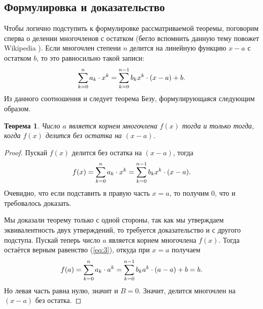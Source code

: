 \documentclass[12pt]{article}
\newtheorem{theorem}{Теорема}[section]
\begin{document}
\subsection{Формулировка и доказательство}
Чтобы логично подступить к формулировке рассматриваемой теоремы, поговорим сперва о делении многочленов с остатком (бегло вспомнить данную тему повожет Wikipedia \cite{poly_div}). Если многочлен степени $n$ делится на линейную функцию $x-a$ с остатком $b$, то это равносильно такой записи:
\begin{equation}
\sum_{k=0}^n{a_k \cdot x^k} = \sum_{k=0}^{n-1}{b_k x^k}\cdot \qty(x-a) + b.
\label{eq:3}
\end{equation}
Из данного соотношения и следует теорема Безу, формулирующаяся следующим образом.
\begin{theorem}
	Число $a$ является корнем многочлена $f(x)$ тогда и только тогда, когда $f(x)$ делится без остатка на $(x-a)$.
\end{theorem}
\begin{proof}
Пускай $f(x)$ делится без остатка на $(x-a)$, тогда 
\begin{equation}
f(x) = \sum_{k=0}^n{a_k \cdot x^k} = \sum_{k=0}^{n-1}{b_k x^k}\cdot \qty(x-a).
\end{equation}
Очевидно, что если подставить в правую часть $x=a$, то получим $0$, что и требовалось доказать. 
\par 
Мы доказали теорему только с одной стороны, так как мы утверждаем эквивалентность двух утверждений, то требуется доказательство и с другого подступа. Пускай теперь число $a$ является корнем многочлена $f(x)$. Тогда остаётся верным равенство (\ref{eq:3}), откуда при $x=a$ получаем
\begin{equation}
  f(a) = \sum_{k=0}^n{a_k \cdot a^k} = \sum_{k=0}^{n-1}{b_k a^k}\cdot \qty(a-a) + b = b.
\end{equation}
Но левая часть равна нулю, значит и $B = 0$. Значит, делится многочлен на $(x-a)$ без остатка.
\end{proof}
\end{document}
